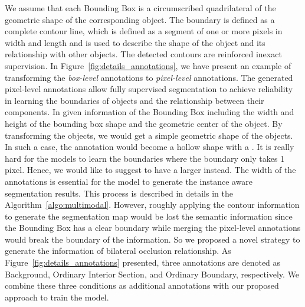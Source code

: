 \documentclass{article}
\begin{document}
{We assume that each Bounding Box is a circumscribed quadrilateral of the geometric shape of the corresponding object.
The boundary is defined as a complete contour line, which is defined as a segment of one or more pixels in width and length and is used to describe the shape of the object and its relationship with other objects. The detected contours are reinforced inexact supervision. In Figure~\ref{fig:details_annotations}, we have present an example of transforming the \textit{box-level} annotations to \textit{pixel-level} annotations.
The generated pixel-level annotations allow fully supervised segmentation to achieve reliability in learning the boundaries of objects and the relationship between their components. In given information of the Bounding Box including the width and height of the bounding box shape and the geometric center of the object. By transforming the objects, we would get a simple geometric shape of the objects. In such a case, the annotation would become a hollow shape with a . It is really hard for the models to learn the boundaries where the boundary only takes 1 pixel. Hence, we would like to suggest to have a larger  instead. The width of the annotations is essential for the model to generate the instance aware segmentation results. This process is described in details in the Algorithm~\ref{algo:multimodal}.
However, roughly applying the contour information to generate the segmentation map would be lost the semantic information since the Bounding Box has a clear boundary while merging the pixel-level annotations would break the boundary of the information. So we proposed a novel strategy to generate the information of bilateral occlusion relationship. 
As Figure~\ref{fig:details_annotations} presented, three annotations are denoted as Background, Ordinary Interior Section, and Ordinary Boundary, respectively. We combine these three conditions as additional annotations with our proposed approach to train the model.
}
\end{document}
